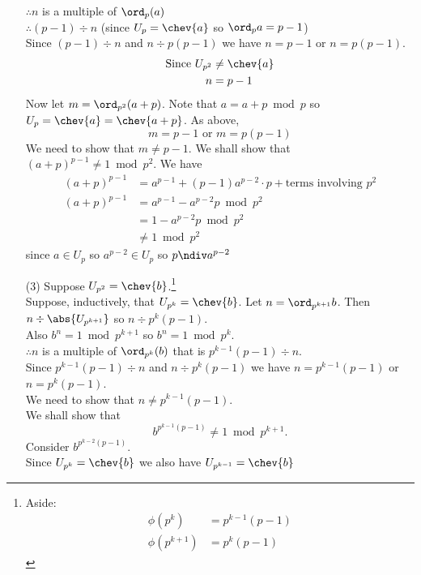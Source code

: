 \begin{enumerate}
$\therefore n$ is a multiple of $\ord_p(a)$ \\
$\therefore (p-1)\div n$ (since $U_p=\chev{a}$ so $\ord_p a=p-1$) \\
Since $(p-1)\div n$ and $n\div p(p-1)$ we have $n=p-1$ or $n=p(p-1)$.
\begin{align*}
\text{Since } U_{p^2} &\neq \chev{a} \\
n &= p-1
\end{align*}
Now let $m=\ord_{p^2}(a+p)$.
Note that $a=a+p\bmod p$ so $U_p=\chev{a}=\chev{a+p}$.
As above,
\[ m = p-1 \text{ or } m = p(p-1) \]
We need to show that $m\neq p-1$.
We shall show that $(a+p)^{p-1}\neq1\bmod p^2$.
We have
\begin{align*}
(a+p)^{p-1} &= a^{p-1} + (p-1)a^{p-2}\cdot p + \text{terms involving $p^2$} \\
(a+p)^{p-1} &= a^{p-1} - a^{p-2}p \bmod p^2 \\
&= 1 - a^{p-2}p \bmod p^2 \\
&\neq 1 \bmod p^2
\end{align*}
since $a\in U_p$ so $a^{p-2}\in U_p$ so $p\ndiv a^{p-2}$
\item[(3)] Suppose $U_{p^2}=\chev{b}$.\footnote{Aside:\begin{align*}
\phi(p^k) &= p^{k-1}(p-1) \\
\phi(p^{k+1}) &= p^k(p-1)
\end{align*}} \\
Suppose, inductively, that $U_{p^k}=\chev{b}$.
Let $n=\ord_{p^{k+1}}b$.
Then $n\div\abs{U_{p^{k+1}}}$ so $n\div p^k(p-1)$. \\
Also $b^n=1\bmod p^{k+1}$ so $b^n=1\bmod p^k$. \\
$\therefore n$ is a multiple of $\ord_{p^k}(b)$ that is $p^{k-1}(p-1)\div n$. \\
Since $p^{k-1}(p-1)\div n$ and $n\div p^k(p-1)$ we have $n=p^{k-1}(p-1)$ or $n=p^k(p-1)$. \\
We need to show that $n\neq p^{k-1}(p-1)$. \\
We shall show that
\[ b^{p^{k-1}(p-1)} \neq 1 \bmod p^{k+1} . \]
Consider $b^{p^{k-2}(p-1)}$. \\
Since $U_{p^k}=\chev{b}$ we also have $U_{p^{k-1}}=\chev{b}$ \\

\end{enumerate}
